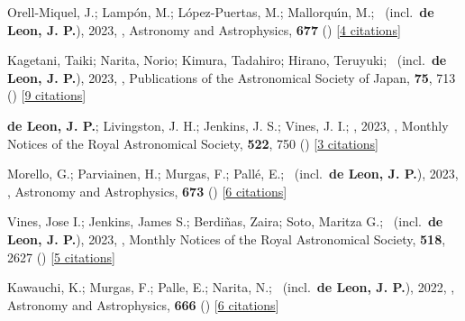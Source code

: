 \item[{\color{numcolor}\scriptsize54}] Orell-Miquel, J.; Lamp{\'o}n, M.; L{\'o}pez-Puertas, M.; Mallorqu{\'\i}n, M.; \etal\ (incl.\ \textbf{de Leon, J. P.}), 2023, , Astronomy and Astrophysics, \textbf{677} () [\href{https://ui.adsabs.harvard.edu/abs/2023A&A...677A..56O}{4 citations}]

\item[{\color{numcolor}\scriptsize53}] Kagetani, Taiki; Narita, Norio; Kimura, Tadahiro; Hirano, Teruyuki; \etal\ (incl.\ \textbf{de Leon, J. P.}), 2023, , Publications of the Astronomical Society of Japan, \textbf{75}, 713 () [\href{https://ui.adsabs.harvard.edu/abs/2023PASJ...75..713K}{9 citations}]

\item[{\color{numcolor}\scriptsize52}] \textbf{de Leon, J. P.}; Livingston, J. H.; Jenkins, J. S.; Vines, J. I.; \etal, 2023, , Monthly Notices of the Royal Astronomical Society, \textbf{522}, 750 () [\href{https://ui.adsabs.harvard.edu/abs/2023MNRAS.522..750D}{3 citations}]

\item[{\color{numcolor}\scriptsize51}] Morello, G.; Parviainen, H.; Murgas, F.; Pall{\'e}, E.; \etal\ (incl.\ \textbf{de Leon, J. P.}), 2023, , Astronomy and Astrophysics, \textbf{673} () [\href{https://ui.adsabs.harvard.edu/abs/2023A&A...673A..32M}{6 citations}]

\item[{\color{numcolor}\scriptsize50}] Vines, Jose I.; Jenkins, James S.; Berdi{\~n}as, Zaira; Soto, Maritza G.; \etal\ (incl.\ \textbf{de Leon, J. P.}), 2023, , Monthly Notices of the Royal Astronomical Society, \textbf{518}, 2627 () [\href{https://ui.adsabs.harvard.edu/abs/2023MNRAS.518.2627V}{5 citations}]

\item[{\color{numcolor}\scriptsize49}] Kawauchi, K.; Murgas, F.; Palle, E.; Narita, N.; \etal\ (incl.\ \textbf{de Leon, J. P.}), 2022, , Astronomy and Astrophysics, \textbf{666} () [\href{https://ui.adsabs.harvard.edu/abs/2022A&A...666A...4K}{6 citations}]

